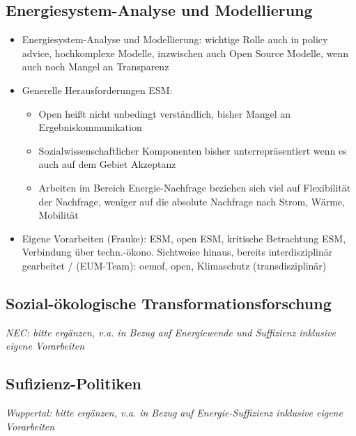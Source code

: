 \documentclass[a4paper,11pt,twoside]{scrartcl}
\begin{document}
\subsection*{Energiesystem-Analyse und Modellierung}
\begin{itemize}
    \item Energiesystem-Analyse und Modellierung: wichtige Rolle auch in policy advice, hochkomplexe Modelle, inzwischen auch Open Source Modelle, wenn auch noch Mangel an Transparenz
    \item Generelle Herausforderungen ESM:
    \begin{itemize}
     \item Open heißt nicht unbedingt verständlich, bisher Mangel an Ergebniskommunikation 
     \item Sozialwissenschaftlicher Komponenten bisher unterrepräsentiert wenn es auch auf dem Gebiet Akzeptanz
     \item Arbeiten im Bereich Energie-Nachfrage beziehen sich viel auf Flexibilität der Nachfrage, weniger auf die absolute Nachfrage nach Strom, Wärme, Mobilität
    \end{itemize}
    \item Eigene Vorarbeiten (Frauke): ESM, open ESM, kritische Betrachtung ESM, Verbindung über techn.-ökono. Sichtweise hinaus, bereits interdisziplinär gearbeitet / (EUM-Team): oemof, open, Klimaschutz (transdisziplinär)
\end{itemize}

\subsection*{Sozial-ökologische Transformationsforschung}
\textit{NEC: bitte ergänzen, v.a. in Bezug auf Energiewende und Suffizienz inklusive eigene Vorarbeiten}
    
\subsection*{Sufizienz-Politiken}
\textit{Wuppertal: bitte ergänzen, v.a. in Bezug auf Energie-Suffizienz inklusive eigene Vorarbeiten}
\end{document}
